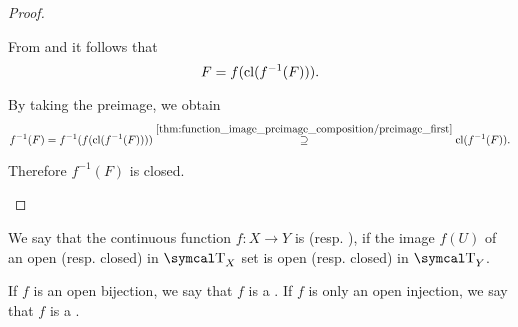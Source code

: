 \begin{proof}
\begin{description}
    From  and  it follows that
    \begin{equation*}
      F = f(\operatorname{cl}(f^{-1}(F))).
    \end{equation*}

    By taking the preimage, we obtain
    \begin{equation*}
      f^{-1}(F)
      =
      f^{-1}(f(\operatorname{cl}(f^{-1}(F))))
      \overset {\ref{thm:function_image_preimage_composition/preimage_first}} \supseteq
      \operatorname{cl}(f^{-1}(F)).
    \end{equation*}

    Therefore \( f^{-1}(F) \) is closed.
  \end{description}
\end{proof}

\begin{definition}\label{def:homeomorphism}
  We say that the continuous function \( f: X \to Y \) is  (resp. ), if the image \( f(U) \) of an open (resp. closed) in \( \CT_X \) set is open (resp. closed) in \( \CT_Y \).

  If \( f \) is an open bijection, we say that \( f \) is a . If \( f \) is only an open injection, we say that \( f \) is a .
\end{definition}

